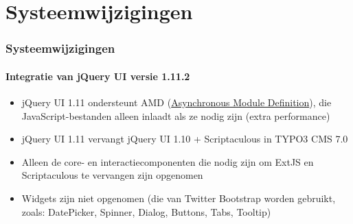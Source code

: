%

\section{Systeemwijzigingen}


\begin{frame}[fragile]
	\frametitle{Systeemwijzigingen}
	\framesubtitle{Integratie van jQuery UI versie 1.11.2}

	\begin{itemize}
		\item jQuery UI 1.11 ondersteunt AMD
			(\href{http://en.wikipedia.org/wiki/Asynchronous_module_definition}{Asynchronous Module Definition}),
			die JavaScript-bestanden alleen inlaadt als ze nodig zijn (extra performance)

    	\item jQuery UI 1.11 vervangt jQuery UI 1.10 + Scriptaculous in TYPO3 CMS 7.0

    	\item Alleen de core- en interactiecomponenten die nodig zijn
    		om ExtJS en Scriptaculous te vervangen zijn opgenomen 

    	\item Widgets zijn niet opgenomen (die van Twitter Bootstrap worden gebruikt,
    		zoals: DatePicker, Spinner, Dialog, Buttons, Tabs, Tooltip)

	\end{itemize}

\end{frame}

